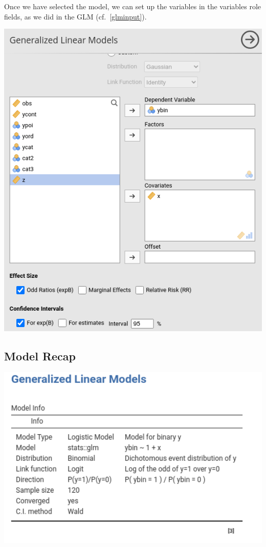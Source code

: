 \documentclass[
]{book}
\begin{document}
Once we have selected the model, we can set up the variables in the variables role fields, as we did in the GLM (cf.~\ref{glminput}).

\includegraphics[width=7.88in]{bookletpics/3_logistic_input2}

\hypertarget{model-recap-1}{%
\subsection{Model Recap}\label{model-recap-1}}

\includegraphics[width=6.08in]{bookletpics/3_logistic_output1}
\end{document}
